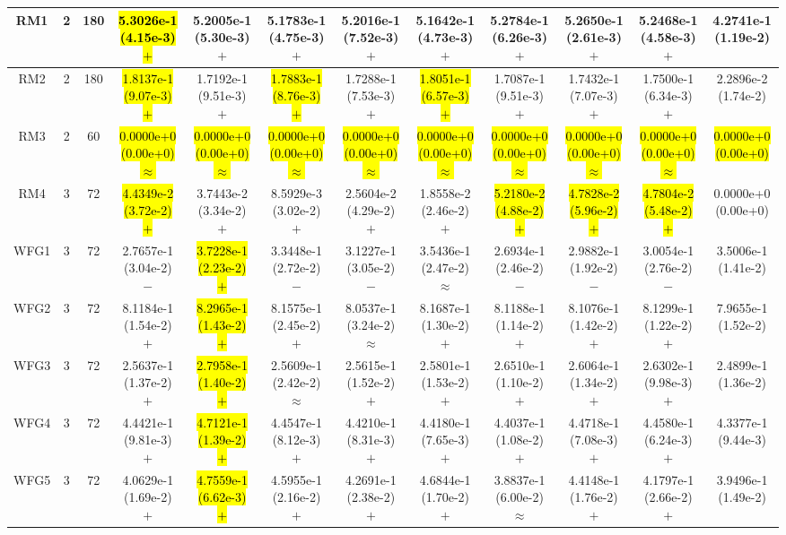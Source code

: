 \documentclass[journal]{IEEEtran}
\begin{document}
\begin{table*}[htbp]
\begin{tabular}{cccccccccccc}
\hline
\multirow{1}{*}{RM1}&2&180&\hl{5.3026e-1 (4.15e-3) $+$}&5.2005e-1 (5.30e-3) $+$&5.1783e-1 (4.75e-3) $+$&5.2016e-1 (7.52e-3) $+$&5.1642e-1 (4.73e-3) $+$&5.2784e-1 (6.26e-3) $+$&5.2650e-1 (2.61e-3) $+$&5.2468e-1 (4.58e-3) $+$&4.2741e-1 (1.19e-2)\\
\hline
\multirow{1}{*}{RM2}&2&180&\hl{1.8137e-1 (9.07e-3) $+$}&1.7192e-1 (9.51e-3) $+$&\hl{1.7883e-1 (8.76e-3) $+$}&1.7288e-1 (7.53e-3) $+$&\hl{1.8051e-1 (6.57e-3) $+$}&1.7087e-1 (9.51e-3) $+$&1.7432e-1 (7.07e-3) $+$&1.7500e-1 (6.34e-3) $+$&2.2896e-2 (1.74e-2)\\
\hline
\multirow{1}{*}{RM3}&2&60&\hl{0.0000e+0 (0.00e+0) $\approx$}&\hl{0.0000e+0 (0.00e+0) $\approx$}&\hl{0.0000e+0 (0.00e+0) $\approx$}&\hl{0.0000e+0 (0.00e+0) $\approx$}&\hl{0.0000e+0 (0.00e+0) $\approx$}&\hl{0.0000e+0 (0.00e+0) $\approx$}&\hl{0.0000e+0 (0.00e+0) $\approx$}&\hl{0.0000e+0 (0.00e+0) $\approx$}&\hl{0.0000e+0 (0.00e+0)}\\
\hline
\multirow{1}{*}{RM4}&3&72&\hl{4.4349e-2 (3.72e-2) $+$}&3.7443e-2 (3.34e-2) $+$&8.5929e-3 (3.02e-2) $+$&2.5604e-2 (4.29e-2) $+$&1.8558e-2 (2.46e-2) $+$&\hl{5.2180e-2 (4.88e-2) $+$}&\hl{4.7828e-2 (5.96e-2) $+$}&\hl{4.7804e-2 (5.48e-2) $+$}&0.0000e+0 (0.00e+0)\\
\hline
\multirow{1}{*}{WFG1}&3&72&2.7657e-1 (3.04e-2) $-$&\hl{3.7228e-1 (2.23e-2) $+$}&3.3448e-1 (2.72e-2) $-$&3.1227e-1 (3.05e-2) $-$&3.5436e-1 (2.47e-2) $\approx$&2.6934e-1 (2.46e-2) $-$&2.9882e-1 (1.92e-2) $-$&3.0054e-1 (2.76e-2) $-$&3.5006e-1 (1.41e-2)\\
\hline
\multirow{1}{*}{WFG2}&3&72&8.1184e-1 (1.54e-2) $+$&\hl{8.2965e-1 (1.43e-2) $+$}&8.1575e-1 (2.45e-2) $+$&8.0537e-1 (3.24e-2) $\approx$&8.1687e-1 (1.30e-2) $+$&8.1188e-1 (1.14e-2) $+$&8.1076e-1 (1.42e-2) $+$&8.1299e-1 (1.22e-2) $+$&7.9655e-1 (1.52e-2)\\
\hline
\multirow{1}{*}{WFG3}&3&72&2.5637e-1 (1.37e-2) $+$&\hl{2.7958e-1 (1.40e-2) $+$}&2.5609e-1 (2.42e-2) $\approx$&2.5615e-1 (1.52e-2) $+$&2.5801e-1 (1.53e-2) $+$&2.6510e-1 (1.10e-2) $+$&2.6064e-1 (1.34e-2) $+$&2.6302e-1 (9.98e-3) $+$&2.4899e-1 (1.36e-2)\\
\hline
\multirow{1}{*}{WFG4}&3&72&4.4421e-1 (9.81e-3) $+$&\hl{4.7121e-1 (1.39e-2) $+$}&4.4547e-1 (8.12e-3) $+$&4.4210e-1 (8.31e-3) $+$&4.4180e-1 (7.65e-3) $+$&4.4037e-1 (1.08e-2) $+$&4.4718e-1 (7.08e-3) $+$&4.4580e-1 (6.24e-3) $+$&4.3377e-1 (9.44e-3)\\
\hline
\multirow{1}{*}{WFG5}&3&72&4.0629e-1 (1.69e-2) $+$&\hl{4.7559e-1 (6.62e-3) $+$}&4.5955e-1 (2.16e-2) $+$&4.2691e-1 (2.38e-2) $+$&4.6844e-1 (1.70e-2) $+$&3.8837e-1 (6.00e-2) $\approx$&4.4148e-1 (1.76e-2) $+$&4.1797e-1 (2.66e-2) $+$&3.9496e-1 (1.49e-2)\\

\end{tabular}
\end{table*}
\end{document}
